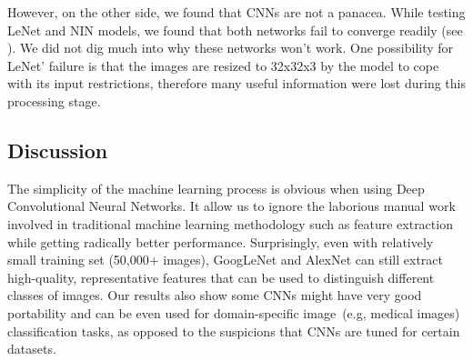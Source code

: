 However, on the other side, we found that CNNs are not a panacea. While testing LeNet and NIN models, we found that both networks fail to converge readily (see ). We did not dig much into why these networks won't work. One possibility for LeNet' failure is that the images are resized to 32x32x3 by the model to cope with its 
input restrictions, therefore many useful information were lost during this processing stage. 
    
\subsection{Discussion}

The simplicity of the machine learning process is obvious when using Deep Convolutional Neural Networks. It allow us to ignore the laborious manual work involved in traditional machine learning methodology such as feature extraction while getting radically better performance. Surprisingly, 
even with relatively small training set (50,000+ images), GoogLeNet and AlexNet can still  
extract high-quality, representative features that can be used to distinguish different classes of images. Our results also show some CNNs might have very good portability and can be even used for domain-specific image~(e.g, medical images) 
classification tasks, as opposed to the suspicions that CNNs are tuned for certain datasets. 



